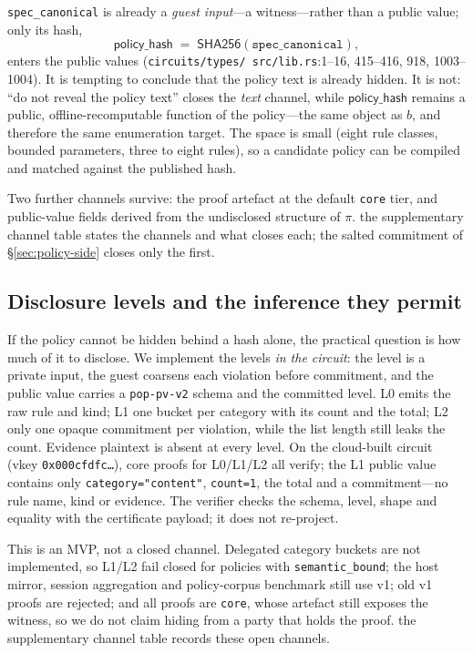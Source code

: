 \documentclass[10pt,journal,compsoc]{IEEEtran}
\begin{document}
\texttt{spec\_canonical} is already a \emph{guest input}---a witness---rather
than a public value; only its hash,
\[
\mathsf{policy\_hash} \;=\; \mathsf{SHA256}(\texttt{spec\_canonical}),
\]
enters the public values (\texttt{circuits/\allowbreak types/\allowbreak
src/\allowbreak lib.rs}:1--16, 415--416, 918, 1003--1004). It is tempting to
conclude that the policy text is already hidden. It is not: ``do not reveal the
policy text'' closes the \emph{text} channel, while
$\mathsf{policy\_hash}$ remains a public, offline-recomputable function of the
policy---the same object as $b$, and therefore the same enumeration target. The
space is small (eight rule classes, bounded parameters, three to eight rules), so
a candidate policy can be compiled and matched against the published hash.

Two further channels survive: the proof artefact at the default \texttt{core}
tier, and public-value fields derived from the undisclosed structure of $\pi$.
the supplementary channel table states the channels and what closes each; the salted
commitment of \S\ref{sec:policy-side} closes only the first.



\subsection{Disclosure levels and the inference they permit}
\label{sec:eval-policy}

If the policy cannot be hidden behind a hash alone, the practical question is
how much of it to disclose. We implement the levels \emph{in the circuit}: the
level is a private input, the guest coarsens each violation before commitment,
and the public value carries a \texttt{pop-pv-v2} schema and the committed
level. L0 emits the raw rule and kind; L1 one bucket per category with its
count and the total; L2 only one opaque commitment per violation, while the
list length still leaks the count. Evidence plaintext is absent at every level. On
the cloud-built circuit (vkey \texttt{0x000cfdfc\ldots}), core proofs for
L0/L1/L2 all verify; the L1 public value contains only
\texttt{category="content"}, \texttt{count=1}, the total and a
commitment---no rule name, kind or evidence. The verifier checks the schema,
level, shape and equality with the certificate payload; it does not re-project.

This is an MVP, not a closed channel. Delegated category buckets are not
implemented, so L1/L2 fail closed for policies with \texttt{semantic\_bound};
the host mirror, session aggregation and policy-corpus benchmark still use v1;
old v1 proofs are rejected; and all proofs are \texttt{core}, whose artefact
still exposes the witness, so we do not claim hiding from a party that holds
the proof. the supplementary channel table records these open channels.
\end{document}
